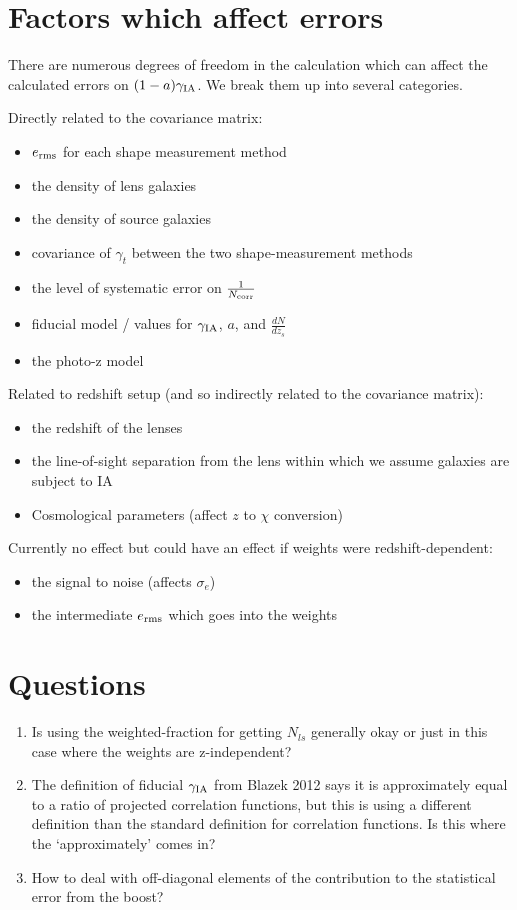 \documentclass[onecolumn,amsmath,aps,fleqn, superscriptaddress]{revtex4}
\begin{document}
\section*{Factors which affect errors}
There are numerous degrees of freedom in the calculation which can affect the calculated errors on $(1-a)\gamma_{\rm IA}$. We break them up into several categories.

Directly related to the covariance matrix:
\begin{itemize}
\item{$e_{\rm rms}$ for each shape measurement method}
\item{the density of lens galaxies}
\item{the density of source galaxies}
\item{covariance of $\gamma_t$ between the two shape-measurement methods}
\item{the level of systematic error on $\frac{1}{N_{\rm corr}}$}
\item{fiducial model / values for $\gamma_{\rm IA}$, $a$, and $\frac{dN}{dz_s}$}
\item{the photo-z model}
\end{itemize}

Related to redshift setup (and so indirectly related to the covariance matrix):
\begin{itemize}
\item{the redshift of the lenses}
\item{the line-of-sight separation from the lens within which we assume galaxies are subject to IA}
\item{Cosmological parameters (affect $z$ to $\chi$ conversion)}
\end{itemize}

Currently no effect but could have an effect if weights were redshift-dependent:
\begin{itemize}
\item{the signal to noise (affects $\sigma_e$)}
\item{the intermediate $e_{\rm rms}$ which goes into the weights}
\end{itemize}

\section*{Questions}
\begin{enumerate}
\item{Is using the weighted-fraction for getting $N_{ls}$ generally okay or just in this case where the weights are z-independent? }
\item{The definition of fiducial $\gamma_{\rm IA}$ from Blazek 2012 says it is approximately equal to a ratio of projected correlation functions, but this is using a different definition than the standard definition for correlation functions. Is this where the `approximately' comes in?}
\item{How to deal with off-diagonal elements of the contribution to the statistical error from the boost?}
\end{enumerate}


\end{document}
